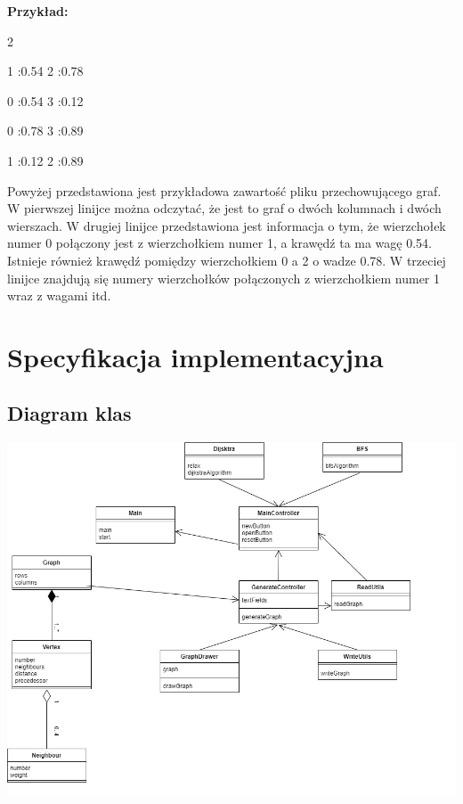 \documentclass[11pt,a4paper]{report}
\newenvironment{multiconsole}{\begingroup\fontfamily{qcr}\selectfont}{\endgroup}
\begin{document}
    \vspace{1em}

    \noindent
    \textbf{Przykład:}

    \begin{multiconsole}
        2 2

        \hspace*{2em}1 :0.54  2 :0.78

        \hspace*{2em}0 :0.54  3 :0.12

        \hspace*{2em}0 :0.78  3 :0.89

        \hspace*{2em}1 :0.12  2 :0.89
    \end{multiconsole}

    Powyżej przedstawiona jest przykładowa zawartość pliku przechowującego graf. W pierwszej linijce można odczytać, że jest to graf o dwóch kolumnach i dwóch wierszach. W drugiej linijce przedstawiona jest informacja o tym, że wierzchołek numer 0 połączony jest z wierzchołkiem numer 1, a krawędź ta ma wagę 0.54. Istnieje również krawędź pomiędzy wierzchołkiem 0 a 2 o wadze 0.78. W trzeciej linijce znajdują się numery wierzchołków połączonych z wierzchołkiem numer 1 wraz z wagami itd.





    \newpage
    \chapter{Specyfikacja implementacyjna}

    \newpage
    \section{Diagram klas}

    \includegraphics[width=\textwidth]{diagram.png}
\end{document}
